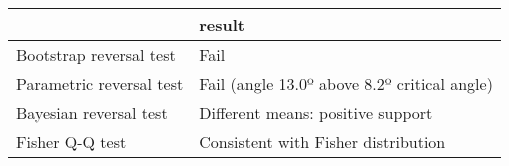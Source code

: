 \begin{tabular}{ll}
\toprule
{} &                                        result \\
\midrule
Bootstrap reversal test  &                                          Fail \\
Parametric reversal test &  Fail (angle 13.0º above 8.2º critical angle) \\
Bayesian reversal test   &             Different means: positive support \\
Fisher Q-Q test          &           Consistent with Fisher distribution \\
\bottomrule
\end{tabular}
